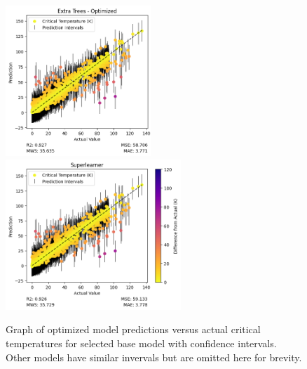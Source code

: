 \documentclass[twocolumn, nofootinbib, secnumarabic, amssymb, nobibnotes, aps, prd]{revtex4-2}
\begin{document}
\begin{figure}[!h]
    \includegraphics[height=2.23in]{images/subfigures/uncertainty/extra_trees_optimized.png}
    \includegraphics[height=2.23in]{images/subfigures/uncertainty/superlearner.png}
    \caption{Graph of optimized model predictions versus actual critical temperatures for selected base model with confidence intervals. Other models have similar invervals but are omitted here for brevity.}
\end{figure}\label{fig:results-uncertainty}
\clearpage
\end{document}
